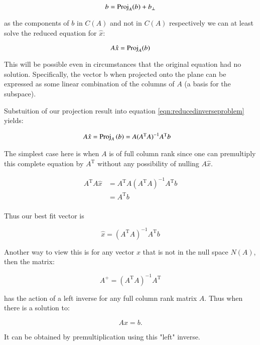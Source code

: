 \documentclass{article}      %
\DeclareMathOperator{\TextTranspose}{T}
\newcommand{\transpose}[1]{{{#1}^{\TextTranspose}}}
\begin{document}
\[
b = \operatorname{Proj}_A(b) + b_\perp
\]

as the components of $b$ in $C(A)$ and not in $C(A)$ respectively we can at least solve the reduced equation for $\hat{x}$:

\begin{equation}\label{eqn:reducedinverseproblem}
A \hat{x} = \operatorname{Proj}_A(b)
\end{equation}


This will be possible even in circumstances that the original equation had no solution.  Specifically, the vector b when projected onto the plane can be expressed as some
linear combination of the columns of $A$ (a basis for the subspace).

Substuition of our projection result into equation \ref{eqn:reducedinverseproblem} yields:

\begin{align*}
A \hat{x} 
&= \Proj_{A}\left(b\right) = A (\transpose{A} A)^{-1} \transpose{A} b
\end{align*}

The simplest case here is when $A$ is of full column rank since one can premultiply this complete equation by $\transpose{A}$ without any possibility of nulling
$A \hat{x}$.

\begin{align*}
\transpose{A} A \hat{x} 
&= \transpose{A} A (\transpose{A} A)^{-1} \transpose{A} b \\
&= \transpose{A} b \\
\end{align*}

Thus our best fit vector is

\begin{equation}
\hat{x} 
= (\transpose{A} A)^{-1} \transpose{A} b
\end{equation}

Another way to view this is for any vector $x$ that is not in the null space $N(A)$, then the matrix:

\begin{equation}
A^{+}= (\transpose{A} A)^{-1} \transpose{A}
\end{equation}

has the action of a left inverse for any full column rank matrix $A$.  Thus when there is a solution to:

\begin{equation}
A x = b.
\end{equation}

It can be obtained by premultiplication using this "left" inverse.
\end{document}
